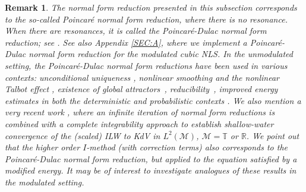 \documentclass[letterpaper, 11pt,  reqno]{amsart}
\newtheorem{remark}[theorem]{Remark}
\newcommand{\1}{\hspace{0.5mm}\text{I}\hspace{0.5mm}}
\newcommand{\R}{\mathbb{R}}
\newcommand{\T}{\mathbb{T}}
\newcommand{\M}{\mathcal{M}}
\numberwithin{equation}{section}
\numberwithin{theorem}{section}
\begin{document}
\begin{remark}\label{REM:NF1} \rm
The normal form reduction
presented in this subsection
corresponds to the so-called Poincar\'e normal form reduction, 
where there is no resonance.
When there are resonances, it is called
the Poincar\'e-Dulac normal form reduction;
see \cite[Section 1]{GKO}.
See also Appendix 
 \ref{SEC:A}, 
where 
we implement a Poincar\'e-Dulac normal form reduction for the modulated cubic NLS.
In the unmodulated setting, 
the Poincar\'e-Dulac normal form reductions have been 
used in various contexts:
unconditional uniqueness \cite{BIT, KO, GKO, OW, Ki2, Ki3, MP2, OSW}, 
nonlinear smoothing and the nonlinear Talbot effect \cite{ETz, ETz3, ETz2}, 
existence of global attractors~\cite{ETz3}, 
reducibility~\cite{CGKO}, 
improved energy estimates 
in both the deterministic and probabilistic contexts
\cite{TT, GO, OW2, OST, OS, STz}.
We also mention a very recent work 
\cite{CLOZ}, 
where an infinite iteration of normal form reductions
is combined with a complete integrability approach
to establish shallow-water convergence of the
(scaled) ILW to KdV in $L^2(\M)$, $\M = \T$ or $\R$.
We point out that 
the
higher order $I$-method (with correction terms) \cite{CKSTT03, CKSTT4}
also corresponds to the Poincar\'e-Dulac normal form reduction, 
but applied to the equation satisfied by a modified energy.
It may be of interest to investigate 
analogues of these results
in the modulated setting.





\end{remark}
\end{document}
